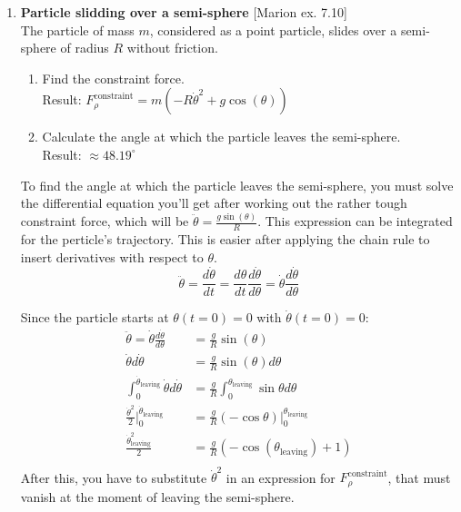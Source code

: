 \documentclass[11pt, a4paper, twoside]{article}
\begin{document}
\begin{enumerate}
	\item
	\begin{minipage}[t][4.5cm]{0.62\textwidth}
		\textbf{Particle slidding over a semi-sphere} [Marion ex. 7.10]\\
		The particle of mass \(m\), considered as a point particle, slides over a semi-sphere of radius \(R\) without friction.
		\begin{enumerate}
			\item Find the constraint force.\\
			Result: \(F^\mathrm{constraint}_{\rho} = m \left(- R \dot{\theta}^{2} + g \cos{\left(\theta \right)}\right)\)
			\item Calculate the angle at which the particle leaves the semi-sphere.\\
			Result: \(\approx 48.19^\circ\) 
		\end{enumerate}
	\end{minipage}
	\begin{minipage}[c][0cm][t]{0.3\textwidth}
		
	\end{minipage}
	
	To find the angle at which the particle leaves the semi-sphere, you must solve the differential equation you'll get after working out the rather tough constraint force, which will be $\ddot{\theta} = \frac{g \sin(\theta)}{R}$.
	This expression can be integrated for the perticle's trajectory.
	This is easier after applying the chain rule to insert derivatives with respect to \(\theta\).
	$$
		\ddot{\theta} 
		= \frac{d \dot{\theta} }{d t} 
		= \frac{d \theta}{d t} \frac{d \dot{\theta}}{d \theta} 
		= \dot{\theta} \frac{d \dot{\theta}}{d \theta}
	$$

	Since the particle starts at $\theta(t=0) = 0$ with $\dot{\theta}(t=0) = 0$:
	$$
	\begin{aligned}
		\ddot{\theta} = \dot{\theta} \frac{d \dot{\theta}}{d \theta}
		&= \frac{g}{R} \sin(\theta)\\
		\dot{\theta} d \dot{\theta}
		&= \frac{g}{R} \sin(\theta) d \theta \\
		\int_0^{\dot{\theta}_\mathrm{leaving}} \dot{\theta} d \dot{\theta}
		&= \frac{g}{R} \int_0^{\theta_\mathrm{leaving}} \sin{\theta} d \theta\\
		\frac{\dot{\theta}^2}{2} \bigg|_0^{\dot{\theta}_\mathrm{leaving}}
		&= \frac{g}{R} (-\cos{\theta}) \bigg|_0^{\theta_\mathrm{leaving}}\\
		\frac{\dot{\theta}_\mathrm{leaving}^2}{2}
		&= \frac{g}{R} (-\cos(\theta_\mathrm{leaving}) + 1)\\
	\end{aligned}
	$$
	After this, you have to substitute $\dot{\theta}^2$ in an expression for $F^\mathrm{constraint}_{\rho}$, that must vanish at the moment of leaving the semi-sphere.


\end{enumerate}
\end{document}
